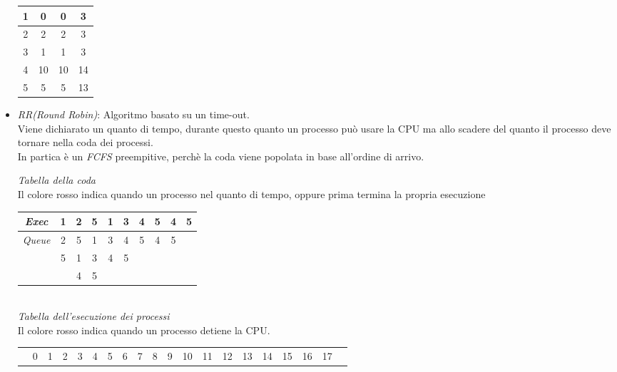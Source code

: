 \documentclass{article}
\begin{document}
\begin{itemize}
\begin{center}
\begin{tabular}{|c|c|c|c|}
                \hline
                1 & 0 & 0 & 3\\
                \hline
                2 & 2 & 2 & 3\\
                \hline
                3 & 1 & 1 & 3\\
                \hline
                4 & 10 & 10 & 14\\
                \hline
                5 & 5 & 5 & 13\\
                \hline
            \end{tabular}
        \end{center}
        \item \emph{RR(Round Robin)}: Algoritmo basato su un time-out.\\
        Viene dichiarato un quanto di tempo, durante questo quanto un processo può usare la CPU ma allo scadere del quanto il processo deve tornare nella coda dei processi.\\
        In partica è un \emph{FCFS} preempitive, perchè la coda viene popolata in base all'ordine di arrivo.
        \begin{center}
            \emph{Tabella della coda}\\
            Il colore rosso indica quando un processo nel quanto di tempo, oppure prima termina la propria esecuzione
            \begin{tabular}{|c|c|c|c|c|c|c|c|c|c|}
                \hline
                \emph{Exec} & 1 & \cellcolor{red!25}2 & 5 & \cellcolor{red!25}1 & \cellcolor{red!25}3 & 4 & 5 & \cellcolor{red!25}4 & \cellcolor{red!25}5\\
                \hline
                \emph{Queue} & 2 & 5 & 1 & 3 & 4 & 5 & 4 & 5 &\\
                            & 5 & 1 & 3 & 4 & 5 & & & &\\
                            & & 4 & 5 & & & & & &\\
                \hline
            \end{tabular}\\
            \vspace{1cm}
            \emph{Tabella dell'esecuzione dei processi}\\
            Il colore rosso indica quando un processo detiene la CPU.
            \begin{tabular}{|c|c|c|c|c|c|c|c|c|c|c|c|c|c|c|c|c|c|c|c|}
                \hline
                & 0 & 1 & 2 & 3 & 4 & 5 & 6 & 7 & 8 & 9 & 10 & 11 & 12 & 13 & 14 & 15 & 16 & 17\\

\end{tabular}
\end{center}
\end{itemize}
\end{document}
